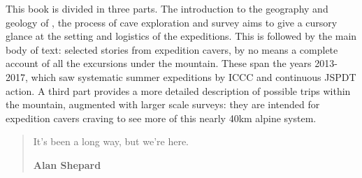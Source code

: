 
\mydelimiter

This book is divided in three parts. The introduction to the geography and geology of , the process of cave exploration and survey aims to give a cursory glance at the setting and logistics of the expeditions. This is followed by the main body of text: selected stories from expedition cavers, by no means a complete account of all the excursions under the mountain. These span the years 2013-2017, which saw systematic summer expeditions by ICCC and continuous JSPDT action. A third part provides a more detailed description of possible trips within the mountain, augmented with larger scale surveys: they are intended for expedition cavers craving to see more of this nearly 40km alpine system. 



\mydelimiter


\begin{quote}
It's been a long way, but we're here.
 
\raggedleft\normalsize\sffamily\textbf{Alan Shepard} \par\end{quote}